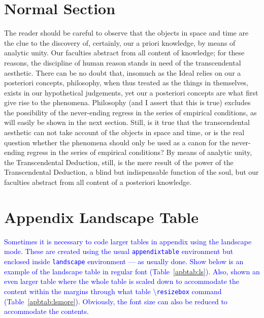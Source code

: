 \documentclass[phd]{ndsu-thesis-2022}
\newcommand\italk[1]{\textcolor{blue}{#1}}  %
\newcommand\cmd[1]{\textbackslash\texttt{#1}}  %
\begin{document}

\section{Normal Section}
The reader should be careful to observe that the objects in space and time are the clue to the discovery of, certainly, our a priori knowledge, by means of analytic unity. Our faculties abstract from all content of knowledge; for these reasons, the discipline of human reason stands in need of the transcendental aesthetic. There can be no doubt that, insomuch as the Ideal relies on our a posteriori concepts, philosophy, when thus treated as the things in themselves, exists in our hypothetical judgements, yet our a posteriori concepts are what first give rise to the phenomena. Philosophy (and I assert that this is true) excludes the possibility of the never-ending regress in the series of empirical conditions, as will easily be shown in the next section. Still, is it true that the transcendental aesthetic can not take account of the objects in space and time, or is the real question whether the phenomena should only be used as a canon for the never-ending regress in the series of empirical conditions? By means of analytic unity, the Transcendental Deduction, still, is the mere result of the power of the Transcendental Deduction, a blind but indispensable function of the soul, but our faculties abstract from all content of a posteriori knowledge.

\section{Appendix Landscape Table}
\italk{Sometimes it is necessary to code larger tables in appendix using the landscape mode. These are created using the usual \texttt{appendixtable} environment but enclosed inside \texttt{landscape} environment --- as usually done. Show below is an example of the landscape table in regular font (Table~\ref{apbtab:ls}). Also, shown an even larger table where the whole table is scaled down to accommodate the content within the margins through what table \cmd{resizebox} command (Table~\ref{apbtab:lsmore}). Obviously, the font size can also be reduced to accommodate the contents. }
\end{document}
